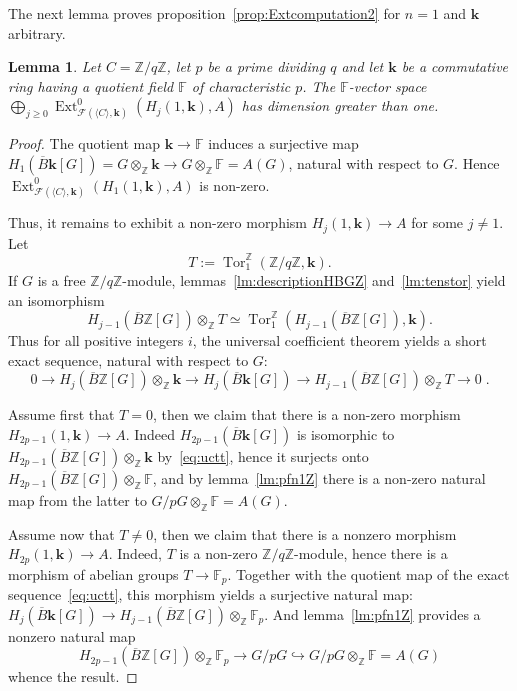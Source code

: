 \documentclass{amsart}
\newtheorem{lemma}[formula]{Lemma}
\theoremstyle{definition}
\theoremstyle{remark}
\newcommand{\Z}{\mathbb Z}
\newcommand{\F}{\mathbb F}
\DeclareMathOperator{\Tor}{Tor}
\DeclareMathOperator{\Ext}{Ext}
\renewcommand{\ge}{\geqslant}
\def\k{\mathbf{k}}
\begin{document}
The next lemma proves proposition~\ref{prop:Extcomputation2} for $n=1$ and $\k$ arbitrary.
\begin{lemma}
	Let $C=\Z/q\Z$, let $p$ be a prime dividing $q$ and let $\k$ be a commutative ring having a quotient field $\F$ of characteristic $p$. 
	The $\F$-vector space $\bigoplus_{j\ge 0}\Ext^0_{\mathcal{F}(\langle C\rangle,\k)}(H_j(1,\k),A)$ has dimension greater than one.
\end{lemma}
\begin{proof}
	The quotient map $\k\to\F$ induces a surjective map $H_1(\overline{B}\k[G])=G\otimes_\Z\k\to G\otimes_\Z\F=A(G)$, natural with respect to $G$. Hence $\Ext^0_{\mathcal{F}(\langle C\rangle,\k)}(H_1(1,\k),A)$ is non-zero. 
	
	Thus, it remains to exhibit a non-zero morphism $H_j(1,\k)\to A$ for some $j\ne 1$.
	Let 
	\[
		T:=\Tor^\Z_1(\Z/q\Z,\k). 
	\]
	If $G$ is a free $\Z/q\Z$-module, lemmas~\ref{lm:descriptionHBGZ} and~\ref{lm:tenstor} yield an isomorphism 
	\[
		H_{j-1}(\overline{B}\Z[G])\otimes_\Z T\simeq \Tor^\Z_1(H_{j-1}(\overline{B}\Z[G]),\k).
	\]
	Thus for all positive integers $i$, the universal coefficient theorem yields a short exact sequence, natural with respect to $G$:
	\begin{equation}\label{eq:uctt}
		0\to H_j(\overline{B}\Z[G])\otimes_\Z\k\to H_j(\overline{B}\k[G])\to H_{j-1}(\overline{B}\Z[G])\otimes_\Z T\to 0\;.
	\end{equation}
	
	Assume first that $T=0$, then we claim that there is a non-zero morphism $H_{2p-1}(1,\k)\to A$. Indeed $H_{2p-1}(\overline{B}\k[G])$ is isomorphic to $H_{2p-1}(\overline{B}\Z[G])\otimes_\Z\k$ by~\eqref{eq:uctt}, hence it surjects onto $H_{2p-1}(\overline{B}\Z[G])\otimes_\Z\F$, and by lemma~\ref{lm:pfn1Z} there is a non-zero natural map from the latter to $G/pG\otimes_\Z \F =A(G)$.
	
	Assume now that $T\ne 0$, then we claim that there is a nonzero morphism $H_{2p}(1,\k)\to A$. Indeed, $T$ is a non-zero $\Z/q\Z$-module, hence there is a morphism of abelian groups $T\to \F_p$. Together with the quotient map of the exact sequence~\eqref{eq:uctt}, this morphism yields a surjective natural map:
	$H_j(\overline{B}\k[G])\to H_{j-1}(\overline{B}\Z[G])\otimes_\Z\F_p$. And lemma~\ref{lm:pfn1Z} provides a nonzero natural map
	\[
		H_{2p-1}(\overline{B}\Z[G])\otimes_\Z\F_p \to G/pG\hookrightarrow G/pG\otimes_\Z\F=A(G)
	\]
	whence the result.
\end{proof}
\end{document}
